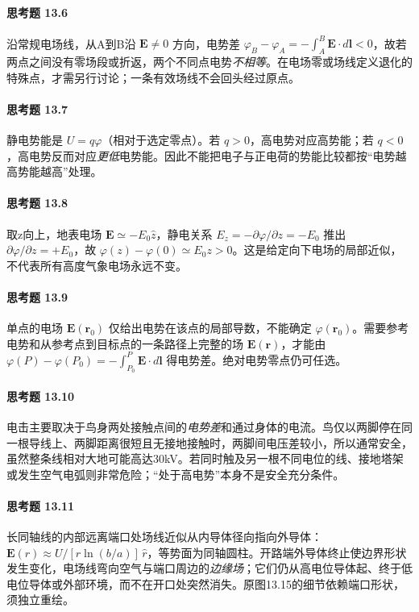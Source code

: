 \paragraph{思考题 13.6}
沿常规电场线，从A到B沿 \(\boldsymbol E\ne0\) 方向，电势差 \(\varphi_B-\varphi_A=-\int_A^B\boldsymbol E\cdot d\boldsymbol l<0\)，故若两点之间没有零场段或折返，两个不同点电势\emph{不相等}。在电场零或场线定义退化的特殊点，才需另行讨论；一条有效场线不会回头经过原点。

\paragraph{思考题 13.7}
静电势能是 \(\boxed{U=q\varphi}\)（相对于选定零点）。若 \(q>0\)，高电势对应高势能；若 \(q<0\)，高电势反而对应\emph{更低}电势能。因此不能把电子与正电荷的势能比较都按“电势越高势能越高”处理。

\paragraph{思考题 13.8}
取z向上，地表电场 \(\boldsymbol E\simeq-E_0\hat z\)，静电关系 \(E_z=-\partial\varphi/\partial z=-E_0\) 推出 \(\partial\varphi/\partial z=+E_0\)，故 \(\boxed{\varphi(z)-\varphi(0)\simeq E_0z>0}\)。这是给定向下电场的局部近似，不代表所有高度气象电场永远不变。

\paragraph{思考题 13.9}
单点的电场 \(\boldsymbol E(\boldsymbol r_0)\) 仅给出电势在该点的局部导数，不能确定 \(\varphi(\boldsymbol r_0)\)。需要参考电势和从参考点到目标点的一条路径上完整的场 \(\boldsymbol E(\boldsymbol r)\)，才能由 \(\boxed{\varphi(P)-\varphi(P_0)=-\int_{P_0}^P\boldsymbol E\cdot d\boldsymbol l}\) 得电势差。绝对电势零点仍可任选。

\paragraph{思考题 13.10}
电击主要取决于鸟身两处接触点间的\emph{电势差}和通过身体的电流。鸟仅以两脚停在同一根导线上、两脚距离很短且无接地接触时，两脚间电压差较小，所以通常安全，虽然整条线相对大地可能高达30kV。若同时触及另一根不同电位的线、接地塔架或发生空气电弧则非常危险；“处于高电势”本身不是安全充分条件。

\paragraph{思考题 13.11}
长同轴线的内部远离端口处场线近似从内导体径向指向外导体：\(\boldsymbol E(r)\approx U/[r\ln(b/a)]\,\hat r\)，等势面为同轴圆柱。开路端外导体终止使边界形状发生变化，电场线弯向空气与端口周边的\emph{边缘场}；它们仍从高电位导体起、终于低电位导体或外部环境，而不在开口处突然消失。原图13.15的细节依赖端口形状，须独立重绘。
